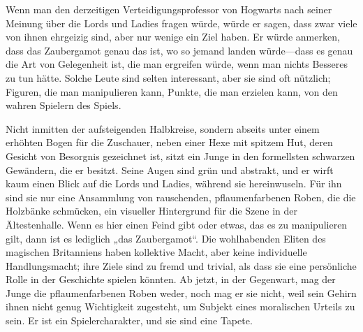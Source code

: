 Wenn man den derzeitigen Verteidigungsprofessor von Hogwarts nach seiner Meinung über die Lords und Ladies fragen würde, würde er sagen, dass zwar viele von ihnen ehrgeizig sind, aber nur wenige ein Ziel haben. Er würde anmerken, dass das Zaubergamot genau das ist, wo so jemand landen würde—dass es genau die Art von Gelegenheit ist, die man ergreifen würde, wenn man nichts Besseres zu tun hätte. Solche Leute sind selten interessant, aber sie sind oft nützlich; Figuren, die man manipulieren kann, Punkte, die man erzielen kann, von den wahren Spielern des Spiels.

Nicht inmitten der aufsteigenden Halbkreise, sondern abseits unter einem erhöhten Bogen für die Zuschauer, neben einer Hexe mit spitzem Hut, deren Gesicht von Besorgnis gezeichnet ist, sitzt ein Junge in den formellsten schwarzen Gewändern, die er besitzt. Seine Augen sind grün und abstrakt, und er wirft kaum einen Blick auf die Lords und Ladies, während sie hereinwuseln. Für ihn sind sie nur eine Ansammlung von rauschenden, pflaumenfarbenen Roben, die die Holzbänke schmücken, ein visueller Hintergrund für die Szene in der Ältestenhalle. Wenn es hier einen Feind gibt oder etwas, das es zu manipulieren gilt, dann ist es lediglich „das Zaubergamot“.
Die wohlhabenden Eliten des magischen Britanniens haben kollektive Macht, aber keine individuelle Handlungsmacht; ihre Ziele sind zu fremd und trivial, als dass sie eine persönliche Rolle in der Geschichte spielen könnten. Ab jetzt, in der Gegenwart, mag der Junge die pflaumenfarbenen Roben weder, noch mag er sie nicht, weil sein Gehirn ihnen nicht genug Wichtigkeit zugesteht, um Subjekt eines moralischen Urteils zu sein. Er ist ein Spielercharakter, und sie sind eine Tapete.

